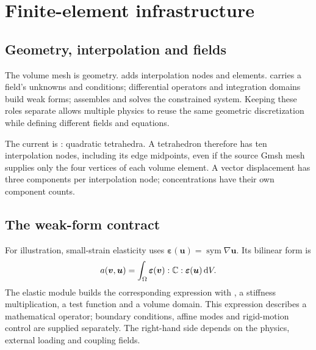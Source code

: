 \chapter{Finite-element infrastructure}\label{chap:fem}
\section{Geometry, interpolation and fields}\label{sec:femArchitecture}
The volume mesh is geometry.  adds interpolation nodes and elements.  carries a field's unknowns and conditions; differential operators and integration domains build weak forms;  assembles and solves the constrained system. Keeping these roles separate allows multiple physics to reuse the same geometric discretization while defining different fields and equations.

The current  is : quadratic tetrahedra. A tetrahedron therefore has ten interpolation nodes, including its edge midpoints, even if the source Gmsh mesh supplies only the four vertices of each volume element. A vector displacement has three components per interpolation node; concentrations have their own component counts.

\section{The weak-form contract}
For illustration, small-strain elasticity uses $\bm\varepsilon(\bm u)=\operatorname{sym}\nabla\bm u$. Its bilinear form is
\begin{equation}
a(\bm v,\bm u)=\int_\Omega\bm\varepsilon(\bm v):\mathbb C:\bm\varepsilon(\bm u)\,\text{d}V.
\end{equation}
The elastic module builds the corresponding expression with , a stiffness multiplication, a test function and a volume domain. This expression describes a mathematical operator; boundary conditions, affine modes and rigid-motion control are supplied separately. The right-hand side depends on the physics, external loading and coupling fields.


